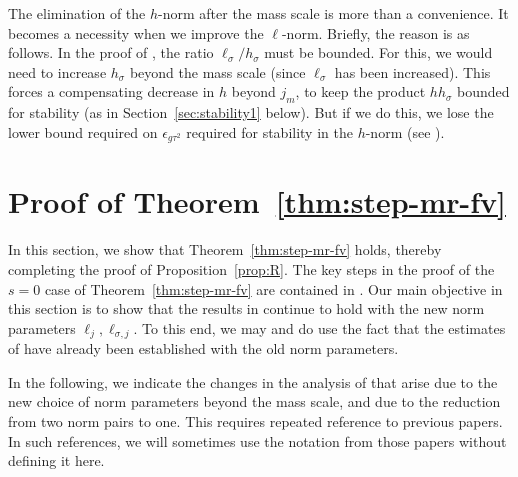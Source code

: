 \begin{rk}
\label{rk:newnorm}
The elimination of the $h$-norm after the mass scale is more than a convenience.
It becomes a necessity when we improve the $\ell$-norm.
Briefly, the reason is as follows. In the proof of
\cite[Lemma~\ref{step-lem:KKK}]{BS-rg-step}, the ratio
$\ell_{\sigma}/h_{\sigma}$
must be bounded. For this, we would need
to increase $h_{\sigma}$
beyond the mass scale  (since $\ell_{\sigma}$ has been increased).
This forces a compensating decrease in $h$
beyond $j_m$, to keep the product $hh_{\sigma}$ bounded for stability
(as in Section~\ref{sec:stability1}
below). But if we do this, we lose the lower bound required on $\epsilon_{g\tau^2}$
required for stability in the $h$-norm (see \cite[\eqref{IE-e:epVbardefz-app}]{BS-rg-IE}).
\end{rk}


\section{Proof of Theorem~\ref{thm:step-mr-fv}}
\label{sec:Rpf2}

In this section, we show that Theorem~\ref{thm:step-mr-fv}
holds, thereby completing the proof of Proposition~\ref{prop:R}.
The key steps in
the proof of the $s = 0$ case of Theorem~\ref{thm:step-mr-fv}
are contained in \cite{BS-rg-IE,BS-rg-step}.
Our main objective in this section is to show that the results in \cite{BS-rg-IE,BS-rg-step}
continue to hold with the new norm parameters $\ell_j,\ell_{\sigma,j}$.
To this end, we may and do use the fact that the estimates of \cite{BS-rg-IE} have already been
established with the old norm parameters.

In the following,
we indicate the changes in the analysis of
\cite{BS-rg-IE,BS-rg-step} that arise due to the new choice of norm parameters 
beyond the mass scale, and due to the reduction from two norm pairs to one.
This requires repeated reference to previous papers. In such references, we will
sometimes use the notation from those papers without defining it here.

